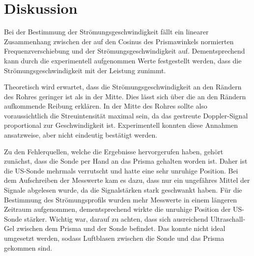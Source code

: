 \section{Diskussion}
\label{sec:diskussion}

Bei der Bestimmung der Strömungsgeschwindigkeit fällt ein linearer Zusammenhang zwischen
der auf den Cosinus des Prismawinkels normierten Frequenzverschiebung und der Strömungsgeschwindigkeit auf. Dementsprechend kann durch die experimentell 
aufgenommen Werte festgestellt werden, dass die Strömungsgeschwindigkeit mit der Leistung zunimmt.

Theoretisch wird erwartet, dass die Strömungsgeschwindigkeit an den Rändern des Rohres geringer ist als in der Mitte.
Dies lässt sich über die an den Rändern aufkommende Reibung erklären. In der Mitte des Rohres sollte also voraussichtlich
die Streuintensität maximal sein, da das gestreute Doppler-Signal proportional zur Geschwindigkeit ist.
Experimentell konnten diese Annahmen ansatzweise, aber nicht eindeutig bestätigt werden.

Zu den Fehlerquellen, welche die Ergebnisse hervorgerufen haben, gehört zunächst, dass die Sonde per Hand an das Prisma gehalten
worden ist. Daher ist die US-Sonde mehrmals verrutscht und hatte eine sehr unruhige Position.
Bei dem Aufschreiben der Messwerte kam es dazu, dass nur ein ungefähres Mittel der Signale abgelesen wurde, da die 
Signalstärken stark geschwankt haben. Für die Bestimmung des Strömungsprofils wurden mehr Messwerte in einem längeren Zeitraum 
aufgenommen, dementsprechend wirkte die unruhige Position der US-Sonde stärker. Wichtig war, darauf zu achten, dass sich ausreichend
Ultraschall-Gel zwischen dem Prisma und der Sonde befindet. Das konnte nicht ideal umgesetzt werden, sodass Luftblasen zwischen die Sonde
und das Prisma gekommen sind.
